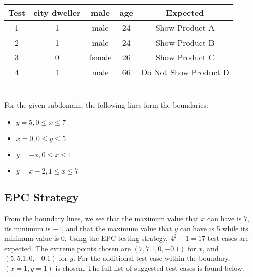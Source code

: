 \documentclass[letterpaper]{article}
\begin{document}
\begin{adjustbox}{center}
	\begin{tabular}{ccccc}
		Test & city dweller & male   & age & Expected              \\ \hline
		1    & 1            & male   & 24  & Show Product A        \\
		2    & 1            & male   & 24  & Show Product B        \\
		3    & 0            & female & 26  & Show Product C        \\
		4    & 1            & male   & 66  & Do Not Show Product D \\
	\end{tabular}
\end{adjustbox} %

\section{}
For the given subdomain, the following lines form the boundaries:
\begin{itemize}
	\item $y=5, 0\leq x\leq 7$
	\item $x=0, 0\leq y \leq 5$
	\item $y=-x, 0\leq x\leq 1$
	\item $y=x-2, 1\leq x \leq 7$
\end{itemize}

\subsection{EPC Strategy}
From the boundary lines, we see that the maximum value that $x$ can have is
$7$, its minimum is $-1$, and that the maximum value that $y$ can have is
5 while its minimum value is 0. Using the EPC testing strategy,
$4^2 + 1=17$ test cases are expected. The extreme points chosen are
$(7, 7.1, 0, -0.1)$ for $x$, and $(5, 5.1, 0, -0.1)$ for $y$.
For the additional test case within the boundary, $(x=1, y=1)$ is chosen.
The full list of suggested test cases is found below:
\vspace{20pt}
\end{document}
